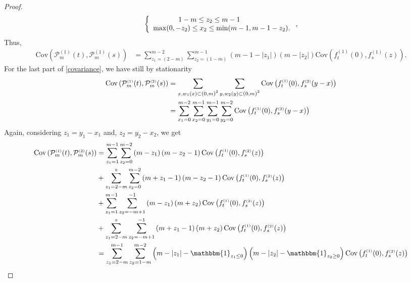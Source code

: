\documentclass[12pt]{article}
\theoremstyle{Theorem}
\theoremstyle{definition}
\begin{document}
\begin{proof}
\begin{align*}
\left\{
\begin{array}{rcl}
1-m \leq z_2 \leq m-1 \hspace{2.5cm}  \\
\max(0, -z_2) \leq x_2 \leq \min(m-1 , m-1-z_2).
\end{array}\right., 
\end{align*}
Thus,
\begin{align*}
\text{Cov}\left(\mathcal{P}_{m}^{\scriptscriptstyle (1)}(t),\mathcal{P}_{m}^{\scriptscriptstyle (1)}(s) \right) &  = \sum_{z_{\scriptscriptstyle 1} = \left(2-m\right)}^{m-2}\sum_{z_{\scriptscriptstyle 2}=\left(1-m\right)}^{m-1}\left(m -1 -|z_{1}|\right)\left(m - |z_{2}|\right) \text{Cov}\left(f_{t}^{\scriptscriptstyle (1)}(0), f_{s}^{\scriptscriptstyle (1)}(z) \right). 
\end{align*}
For the last part of \eqref{covariance}, we have still by stationarity
\begin{align*}
\text{Cov}\left(\mathcal{P}_{m}^{\scriptscriptstyle (1)}(t),\mathcal{P}_{m}^{\scriptscriptstyle (2)}(s) \right) & = \sum_{x, w_{1}(x) \subset \text{\larger[1]{$($}}0, m \text{\larger[1]{$)$}}^{2}} \sum_{y, w_{2}(y) \subset \text{\larger[1]{$($}}0, m \text{\larger[1]{$)$}}^{2}} \text{Cov}\left(f_{t}^{\scriptscriptstyle (1)}(0), f_{s}^{ \scriptscriptstyle (2)}(y-x) \right)\\
& =  \sum_{x_1 = 0}^{m-2}\sum_{x_2 = 0}^{m-1}\sum_{y_1 = 0}^{m-1}\sum_{y_2 = 0}^{m-2}\text{Cov}\left(f_{t}^{\scriptscriptstyle (1)}(0), f_{s}^{ \scriptscriptstyle (2)}(y-x) \right)
\end{align*}
Again, considering $z_1 = y_1 - x_1$ and, $z_{2} = y_{2}-x_{2}$, we get
\begin{align*}
\text{Cov}\left(\mathcal{P}_{m}^{\scriptscriptstyle (1)}(t),\mathcal{P}_{m}^{\scriptscriptstyle (2)}(s) \right) & = \sum_{z_1=1}^{m-1}\sum_{z_2 = 0}^{m-2}\left(m-z_1\right)\left(m-z_2-1\right)\text{Cov}\left(f_{t}^{\scriptscriptstyle (1)}(0), f_{s}^{ \scriptscriptstyle (2)}(z) \right)\\
& +  \sum_{z_1=2-m}^{\scriptscriptstyle 0}\sum_{z_2 = 0}^{m-2}\left(m+z_1-1\right)\left(m-z_2-1\right)\text{Cov}\left(f_{t}^{\scriptscriptstyle (1)}(0), f_{s}^{ \scriptscriptstyle (2)}(z) \right)\\
& +  \sum_{z_1=1}^{m-1}\sum_{z_2 = -m+1}^{-1}\left(m-z_1\right)\left(m+z_2\right)\text{Cov}\left(f_{t}^{\scriptscriptstyle (1)}(0), f_{s}^{ \scriptscriptstyle (2)}(z) \right)\\
& + \sum_{z_1=2-m}^{\scriptscriptstyle 0}\sum_{z_2 = -m+1}^{-1} \left(m+z_1-1\right)\left(m+z_2\right)\text{Cov}\left(f_{t}^{\scriptscriptstyle (1)}(0), f_{s}^{ \scriptscriptstyle (2)}(z) \right) \\
& = \sum_{z_1=2-m}^{m-1} \sum_{z_2 = 1-m}^{m-2} \left(m-|z_1| - \mathbbm{1}_{z_{1} \leq 0}\right)\left(m-|z_2|-\mathbbm{1}_{z_{2} \geq 0}\right)\text{Cov}\left(f_{t}^{\scriptscriptstyle (1)}(0), f_{s}^{ \scriptscriptstyle (2)}(z) \right)
\end{align*}
\end{proof}
\end{document}

